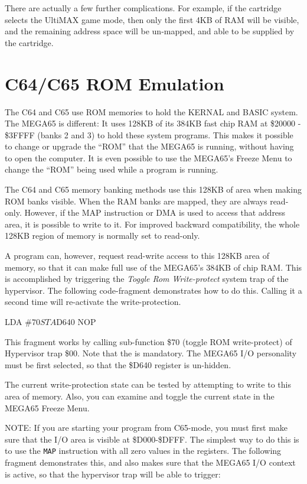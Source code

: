 There are actually a few further complications. For example, if the
cartridge selects the UltiMAX\texttrademark{} game mode, then only the first 4KB
of RAM will be visible, and the remaining address space will be
un-mapped, and able to be supplied by the cartridge.

\section{C64/C65 ROM Emulation}

The C64 and C65 use ROM memories to hold the KERNAL and BASIC system.
The MEGA65 is different: It uses 128KB of its 384KB fast chip RAM at
\$20000 - \$3FFFF (banks 2 and 3) to
hold these system programs. This makes it possible to change or upgrade the
``ROM'' that the MEGA65 is running, without having to open the
computer. It is even possible to use the MEGA65's Freeze Menu to
change the ``ROM'' being used while a program is running.

The C64 and C65 memory banking methods use this 128KB of area when
making ROM banks visible.  When the RAM banks are mapped, they are
always read-only.  However, if the MAP instruction or DMA is used to
access that address area, it is possible to write to it. For improved
backward compatibility, the whole 128KB region of memory is normally
set to read-only.

A program can, however, request read-write access to this
128KB area of memory, so that it can make full use of the MEGA65's
384KB of chip RAM.  This is accomplished by triggering the {\em Toggle
  Rom Write-protect} system trap of the hypervisor.  The following
code-fragment demonstrates how to do this. Calling it a second time
will re-activate the write-protection.

\begin{screencode}
  LDA #$70
  STA $D640
  NOP
\end{screencode}

This fragment works by
calling sub-function \$70 (toggle ROM write-protect) of Hypervisor
trap \$00. Note that the  is mandatory. The MEGA65
I/O personality must be first selected, so that the \$D640 register is
un-hidden.

The current write-protection
state can be tested by attempting to write to this area of memory.
Also, you can examine and toggle the current state in the MEGA65
Freeze Menu.

NOTE: If you are starting your program from C65-mode, you must first make
sure that the I/O area is visible at \$D000-\$DFFF.  The simplest way to do
this is to use the {\tt MAP} instruction with all zero values in the registers.
The following fragment demonstrates this, and also makes sure that the MEGA65 I/O
context is active, so that the hypervisor trap will be able to trigger:

